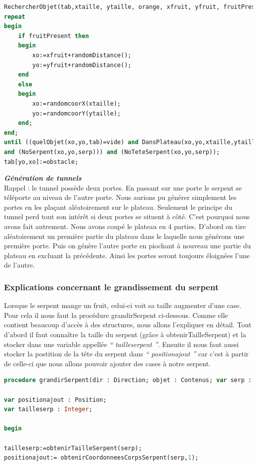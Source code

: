 \documentclass[11pt,a4paper]{article}
\begin{document}
        \small
  \begin{lstlisting}[language=Pascal,frame=single,caption=Code source de la procédure générationObstacle]
RechercherObjet(tab,xtaille, ytaille, orange, xfruit, yfruit, fruitPresent); 
repeat 
begin
    if fruitPresent then
    begin
        xo:=xfruit+randomDistance();
        yo:=yfruit+randomDistance();
    end
    else
    begin			
        xo:=randomcoorX(xtaille);
        yo:=randomcoorY(ytaille);
    end;
end;
until ((quelObjet(xo,yo,tab)=vide) and DansPlateau(xo,yo,xtaille,ytaille)
and (NoSerpent(xo,yo,serp))) and (NoTeteSerpent(xo,yo,serp));
tab[yo,xo]:=obstacle;

\end{lstlisting}
\normalsize
        
        
         \textit{\textbf{Génération de tunnels }}\\
        Rappel :  le tunnel possède deux portes. En passant sur une porte le serpent se téléporte au niveau de l’autre porte. 
        Nous aurions pu générer simplement les portes en les plaçant aléatoirement sur le plateau. Seulement le principe du tunnel perd tout son intérêt si deux portes se situent à côté.  C’est pourquoi nous avons fait autrement.
        Nous avons coupé le plateau en 4 parties. D’abord on tire aléatoirement un première partie du plateau dans le laquelle nous générons une première porte.  Puis on génère l’autre porte en piochant à nouveau une partie du plateau en excluant la précédente. Ainsi les portes seront toujours éloignées l’une de l’autre.
       
        \subsubsection{Explications concernant le grandissement du serpent}

Lorsque le serpent mange un fruit, celui-ci voit sa taille augmenter d'une case. Pour cela il nous faut la procédure grandirSerpent ci-dessous. Comme elle contient beaucoup d'accès à des structures, nous allons l'expliquer en détail. Tout d'abord il faut connaître la taille du serpent (grâce à obtenirTailleSerpent) et la stocker dans une variable appellée \textit{`` tailleserpent ''}. Ensuite il nous faut aussi stocker la postition de la tête du serpent dans \textit{`` positionajout ''} car c'est à partir de celle-ci que nous allons pouvoir ajouter des cases à notre serpent. 

        \small
  \begin{lstlisting}[language=Pascal,frame=single,caption=Première partie du code source de la procédure grandirSerpent]
procedure grandirSerpent(dir : Direction; objet : Contenus; var serp : Serpent);

var positionajout : Position;
var tailleserp : Integer;

begin 

tailleserp:=obtenirTailleSerpent(serp);
positionajout:= obtenirCoordonneesCorpsSerpent(serp,1);

  \end{lstlisting}
  
\end{document}
